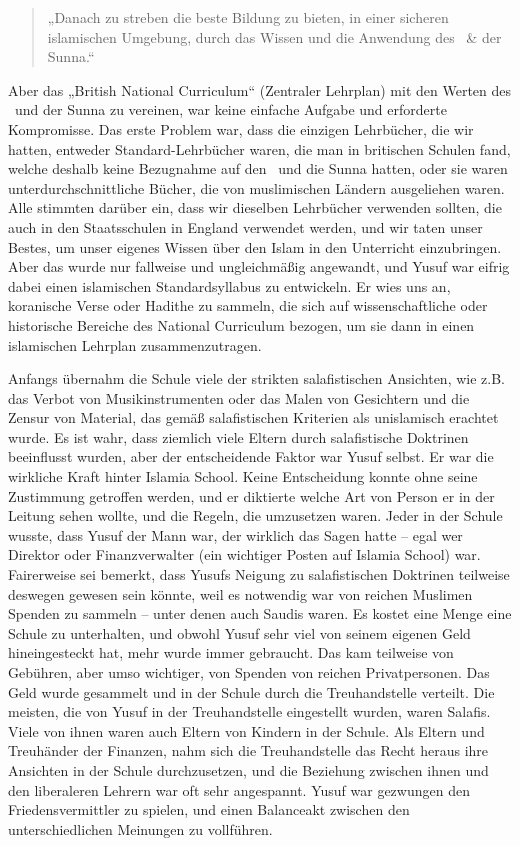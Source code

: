 \documentclass[12pt]{memoir}
\begin{document}
\begin{quote}
„Danach zu streben die beste Bildung zu bieten,
in einer sicheren islamischen Umgebung,
durch das Wissen und die Anwendung des \Quran\ \& der Sunna.“
\end{quote}

Aber das „British National Curriculum“ (Zentraler Lehrplan)
mit den Werten des \Quran\ und der Sunna zu vereinen,
war keine einfache Aufgabe und erforderte Kompromisse.
Das erste Problem war, dass die einzigen Lehrbücher, die wir hatten,
entweder Standard-Lehrbücher waren, die man in britischen Schulen fand,
welche deshalb keine Bezugnahme auf den \Quran\ und die Sunna hatten,
oder sie waren unterdurchschnittliche Bücher,
die von muslimischen Ländern ausgeliehen waren.
Alle stimmten darüber ein, dass wir dieselben Lehrbücher verwenden sollten,
die auch in den Staatsschulen in England verwendet werden,
und wir taten unser Bestes,
um unser eigenes Wissen über den Islam in den Unterricht einzubringen.
Aber das wurde nur fallweise und ungleichmäßig angewandt,
und Yusuf war eifrig dabei einen islamischen Standardsyllabus zu entwickeln.
Er wies uns an, koranische Verse oder Hadithe zu sammeln,
die sich auf wissenschaftliche oder historische Bereiche
des National Curriculum bezogen,
um sie dann in einen islamischen Lehrplan zusammenzutragen.

Anfangs übernahm die Schule viele der strikten salafistischen Ansichten,
wie z.B. das Verbot von Musikinstrumenten oder das Malen von Gesichtern
und die Zensur von Material, das gemäß salafistischen Kriterien
als unislamisch erachtet wurde.
Es ist wahr, dass ziemlich viele Eltern durch salafistische Doktrinen
beeinflusst wurden, aber der entscheidende Faktor war Yusuf selbst.
Er war die wirkliche Kraft hinter Islamia School.
Keine Entscheidung konnte ohne seine Zustimmung getroffen werden,
und er diktierte welche Art von Person er in der Leitung sehen wollte,
und die Regeln, die umzusetzen waren.
Jeder in der Schule wusste, dass Yusuf der Mann war,
der wirklich das Sagen hatte –
egal wer Direktor oder Finanzverwalter
(ein wichtiger Posten auf Islamia School) war.
Fairerweise sei bemerkt, dass Yusufs Neigung zu salafistischen Doktrinen
teilweise deswegen gewesen sein könnte,
weil es notwendig war von reichen Muslimen Spenden zu sammeln –
unter denen auch Saudis waren.
Es kostet eine Menge eine Schule zu unterhalten,
und obwohl Yusuf sehr viel von seinem eigenen Geld hineingesteckt hat,
mehr wurde immer gebraucht.
Das kam teilweise von Gebühren, aber umso wichtiger,
von Spenden von reichen Privatpersonen.
Das Geld wurde gesammelt und in der Schule durch die Treuhandstelle verteilt.
Die meisten, die von Yusuf in der Treuhandstelle eingestellt wurden,
waren Salafis.
Viele von ihnen waren auch Eltern von Kindern in der Schule.
Als Eltern und Treuhänder der Finanzen,
nahm sich die Treuhandstelle das Recht heraus
ihre Ansichten in der Schule durchzusetzen,
und die Beziehung zwischen ihnen und den liberaleren Lehrern
war oft sehr angespannt.
Yusuf war gezwungen den Friedensvermittler zu spielen,
und einen Balanceakt zwischen den unterschiedlichen Meinungen zu vollführen.
\end{document}
